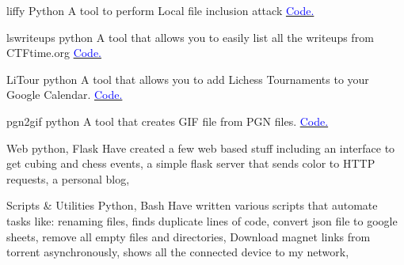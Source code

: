     {liffy}
    {}
    {\scriptsize Python}
    {}
    {
        A tool to perform Local file inclusion attack
        \hfill
        \href{http://github.com/mzfr/liffy}{\textcolor{blue}{\scriptsize Code.}}
    }
    \vspace*{0.2\baselineskip}

    {lswriteups}
    {}
    {\scriptsize python}
    {}
    {
        A tool that allows you to easily list all the writeups from CTFtime.org
        \hfill
        \href{https://github.com/mzfr/lswriteups}{\textcolor{blue}{\scriptsize Code.}}
    }
    \vspace*{0.2\baselineskip}


    {LiTour}
    {}
    {\scriptsize python}
    {}
    {
        A tool that allows you to add Lichess Tournaments to your Google Calendar.
        \hfill
        \href{https://github.com/mzfr/LiTour}{\textcolor{blue}{\scriptsize Code.}}
    }
    \vspace*{0.2\baselineskip}

    {pgn2gif}
    {}
    {\scriptsize python}
    {}
    {
        A tool that creates GIF file from PGN files.
        \hfill
        \href{https://github.com/mzfr/pgn2gif}{\textcolor{blue}{\scriptsize Code.}}
    }
    \vspace*{0.2\baselineskip}


 \cventry{}
     {Web}
     {}
     {\scriptsize python, Flask}
     {}
     {
        Have created a few web based stuff including
        an interface to get cubing and chess events,
        a simple flask server that sends color to HTTP requests,
        a personal blog,
     }
     \vspace*{0.2\baselineskip}

\cventry{}
    {Scripts \& Utilities}
    {}
    {\scriptsize Python, Bash}
    {}
    {
        Have written various scripts that automate tasks like:
        renaming files,
        finds duplicate lines of code,
        convert json file to google sheets,
        remove all empty files and directories,
        Download magnet links from torrent asynchronously,
        shows all the connected device to my network,
    }
    \vspace*{0.2\baselineskip}
